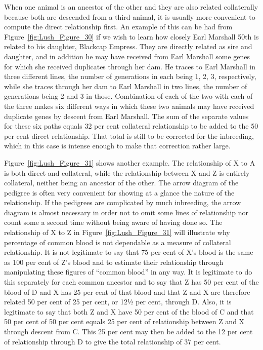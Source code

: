 When one animal is an ancestor of the other and they are also
related collaterally because both are descended from a third animal, it
is usually more convenient to compute the direct relationship first. An
example of this can be had from Figure~\ref{fig:Lush_Figure_30} if we wish to learn how closely
Earl Marshall 50th is related to his daughter, Blackcap Empress.
They are directly related as sire and daughter, and in addition he may
have received from Earl Marshall some genes for which she received
duplicates through her dam. He traces to Earl Marshall in three different
lines, the number of generations in each being 1, 2, 3, respectively,
while she traces through her dam to Earl Marshall in two lines, the
number of generations being 2 and 3 in those. Combination of each of
the two with each of the three makes six different ways in which these
two animals may have received duplicate genes by descent from Earl
Marshall. The sum of the separate values for these six paths equals
32  per cent collateral relationship to be added to the 50 per cent
direct relationship. That total is still to be corrected for the inbreeding,
which in this case is intense enough to make that correction rather
large.

Figure~\ref{fig:Lush_Figure_31} shows another example. The relationship of X to A is
both direct and collateral, while the relationship between X and Z is
entirely collateral, neither being an ancestor of the other. The arrow
diagram of the pedigree is often very convenient for showing at a glance
the nature of the relationship. If the pedigrees are complicated by much
inbreeding, the arrow diagram is almost necessary in order not to omit
some lines of relationship nor count some a second time without being
aware of having done so. The relationship of X to Z in Figure~\ref{fig:Lush_Figure_31} will
illustrate why percentage of common blood is not dependable as a
measure of collateral relationship. It is not legitimate to say that 75 per
cent of X's blood is the same as 100 per cent of Z's blood and to estimate
their relationship through manipulating these figures of ``common
blood'' in any way. It is legitimate to do this separately for each common
ancestor and to say that Z has 50 per cent of the blood of D and X
has 25 per cent of that blood and that Z and X are therefore related 50
per cent of 25 per cent, or 12½ per cent, through D. Also, it is legitimate
to say that both Z and X have 50 per cent of the blood of C and
that 50 per cent of 50 per cent equals 25 per cent of relationship
between Z and X through descent from C. This 25 per cent may then
be added to the 12 per cent of relationship through D to give the total
relationship of 37 per cent.


